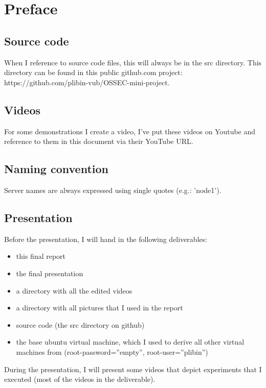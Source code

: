 \documentclass[12pt]{report}
\begin{document}

\tableofcontents %

\newpage %

\chapter*{Preface}
\section{Source code}
When I reference to source code files, this will always be in the src
directory. This directory can be found in this public github.com
project: https://github.com/plibin-vub/OSSEC-mini-project.
\section{Videos}
For some demonstrations I create a video, I've put these videos on
Youtube and reference to them in this document via their YouTube URL.
\section{Naming convention}
Server names are always expressed using single quotes (e.g.: 'node1').
\section{Presentation}
Before the presentation, I will hand in the following deliverables:
\begin{itemize}
\item this final report
\item the final presentation
\item a directory with all the edited videos
\item a directory with all pictures that I used in the report
\item source code (the src directory on github)
\item the base ubuntu virtual machine, which I used to derive all
  other virtual machines from (root-password=''empty'', root-user=''plibin'')
\end{itemize}
During the presentation, I will present some videos that depict
experiments that I executed (most of the videos in the deliverable).
\end{document}
